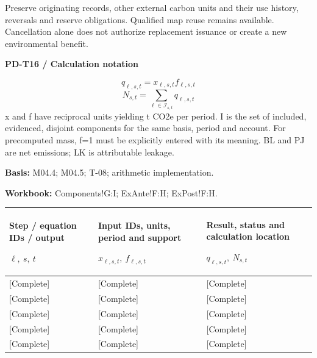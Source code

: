 \begin{Notice}Preserve originating records, other external carbon units and their use history, reversals and reserve obligations. Qualified map reuse remains available. Cancellation alone does not authorize replacement issuance or create a new environmental benefit.\end{Notice}
\par\begingroup\sffamily\fontsize{8}{10}\selectfont\color{NEBGreen}\setlength{\parskip}{2pt}\setlength{\abovedisplayskip}{4pt}\setlength{\belowdisplayskip}{4pt}\setlength{\abovedisplayshortskip}{2pt}\setlength{\belowdisplayshortskip}{3pt}
\textbf{PD-T16 / Calculation notation}\par
{\fontsize{9}{11}\selectfont\[ q_{\ell,s,t}=x_{\ell,s,t}f_{\ell,s,t} \]}
{\fontsize{9}{11}\selectfont\[ N_{s,t}=\sum_{\ell\in\mathcal I_{s,t}}q_{\ell,s,t} \]}
x and f have reciprocal units yielding t CO2e per period. I is the set of included, evidenced, disjoint components for the same basis, period and account. For precomputed mass, f=1 must be explicitly entered with its meaning. BL and PJ are net emissions; LK is attributable leakage.\par
\textbf{Basis:} M04.4; M04.5; T-08; arithmetic implementation.\par
\textbf{Workbook:} Components!G:I; ExAnte!F:H; ExPost!F:H.\par\endgroup
{\sffamily\fontsize{8.3}{10.3}\selectfont\begin{longtable}{@{}P{52.79mm} P{59.39mm} P{52.79mm}@{}}
\toprule
\textbf{Step / equation IDs / output}\par {\normalfont\fontsize{8.2}{10}\selectfont $\ell,\ s,\ t$} & \textbf{Input IDs, units, period and support}\par {\normalfont\fontsize{8.2}{10}\selectfont $x_{\ell,s,t},\ f_{\ell,s,t}$} & \textbf{Result, status and calculation location}\par {\normalfont\fontsize{8.2}{10}\selectfont $q_{\ell,s,t},\ N_{s,t}$}\\\midrule\endhead
\rule{0pt}{7.7mm}[Complete] & [Complete] & [Complete]\\\hline
\rule{0pt}{7.7mm}[Complete] & [Complete] & [Complete]\\\hline
\rule{0pt}{7.7mm}[Complete] & [Complete] & [Complete]\\\hline
\rule{0pt}{7.7mm}[Complete] & [Complete] & [Complete]\\\hline
\rule{0pt}{7.7mm}[Complete] & [Complete] & [Complete]\\\hline
\end{longtable}}
